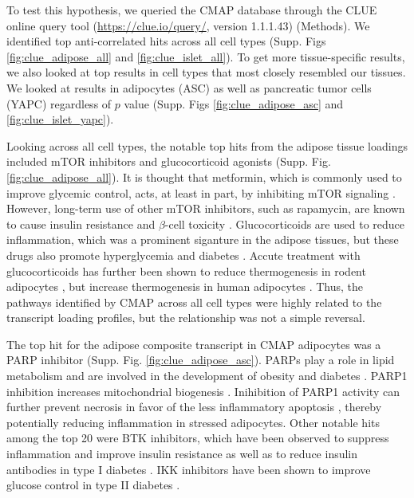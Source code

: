 \documentclass[
]{article}
\begin{document}
To test this hypothesis, we queried the CMAP database through the CLUE
online query tool (\url{https://clue.io/query/}, version 1.1.1.43)
(Methods). We identified top anti-correlated hits across all cell types
(Supp. Figs \ref{fig:clue_adipose_all} and \ref{fig:clue_islet_all}). To
get more tissue-specific results, we also looked at top results in cell
types that most closely resembled our tissues. We looked at results in
adipocytes (ASC) as well as pancreatic tumor cells (YAPC) regardless of
\(p\) value (Supp. Figs \ref{fig:clue_adipose_asc} and
\ref{fig:clue_islet_yapc}).

Looking across all cell types, the notable top hits from the adipose
tissue loadings included mTOR inhibitors and glucocorticoid agonists
(Supp. Fig. \ref{fig:clue_adipose_all}). It is thought that metformin,
which is commonly used to improve glycemic control, acts, at least in
part, by inhibiting mTOR signaling \cite{pmid30290005, 
pmid30034573}. However, long-term use of other mTOR inhibitors, such as
rapamycin, are known to cause insulin resistance and \(\beta\)-cell
toxicity \cite{pmid30034573, pmid23881200, pmid21266327}.
Glucocorticoids are used to reduce inflammation, which was a prominent
siganture in the adipose tissues, but these drugs also promote
hyperglycemia and diabetes \cite{pmid24582093, pmid35585199}. Accute
treatment with glucocorticoids has further been shown to reduce
thermogenesis in rodent adipocytes \cite{pmid30310815, 
pmid11254472, pmid23197361}, but increase thermogenesis in human
adipocytes \cite{pmid27411014, pmid25385872}. Thus, the pathways
identified by CMAP across all cell types were highly related to the
transcript loading profiles, but the relationship was not a simple
reversal.

The top hit for the adipose composite transcript in CMAP adipocytes was
a PARP inhibitor (Supp. Fig. \ref{fig:clue_adipose_asc}). PARPs play a
role in lipid metabolism and are involved in the development of obesity
and diabetes \cite{pmid34450194}. PARP1 inhibition increases
mitochondrial biogenesis \cite{pmid21459330}. Inihibition of PARP1
activity can further prevent necrosis in favor of the less inflammatory
apoptosis \cite{pmid12114611}, thereby potentially reducing inflammation
in stressed adipocytes. Other notable hits among the top 20 were BTK
inhibitors, which have been observed to suppress inflammation and
improve insulin resistance \cite{pmid33648925} as well as to reduce
insulin antibodies in type I diabetes \cite{pmid28753229}. IKK
inhibitors have been shown to improve glucose control in type II
diabetes \cite{pmid28683283, pmid15685170}.
\end{document}
